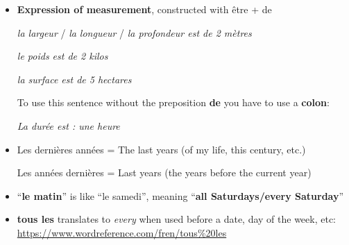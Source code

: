 \documentclass[a4paper,12pt]{article}
\begin{document}
\begin{itemize}
	\item \textbf{Expression of measurement}, constructed with \^etre + de
	\par
	\textit{la largeur} / \textit{la longueur} / \textit{la profondeur est de 2 m\`etres}
	\par
	\textit{le poids est de 2 kilos}
	\par
	\textit{la surface est de 5 hectares}
	\par
	To use this sentence without the preposition \textbf{de} you have to use a \textbf{colon}:
	\par
	\textit{La dur\'ee est : une heure}
	\item Les derni\`eres ann\'ees = The last years (of my life, this century, etc.)
	\par
	Les ann\'ees derni\`eres = Last years (the years before the current year)
	\item ``\textbf{le matin}'' is like ``le samedi'', meaning ``\textbf{all Saturdays/every Saturday}''
	\item \textbf{tous les} translates to \textit{every} when used before a date, day of the week, etc: \url{https://www.wordreference.com/fren/tous\%20les}
\end{itemize}
\end{document}

